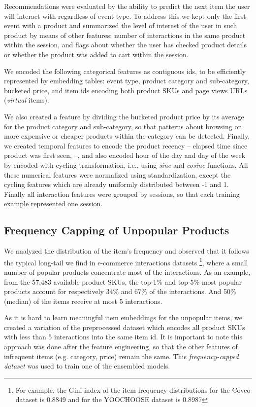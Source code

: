 \documentclass[sigconf,screen]{acmart}
\begin{document}
Recommendations were evaluated by the ability to predict the next item the user will interact with regardless of event type. To address this we kept only the first event with a product and summarized the level of interest of the user in such product by means of other features: number of interactions in the same product within the session, and flags about whether the user has checked product details or whether the product was added to cart within the session.

We encoded the following categorical features as contiguous ids, to be efficiently represented by embedding tables: event type, product category and sub-category, bucketed price, and item ids encoding both product SKUs and page views URLs (\emph{virtual} items). 

We also created a feature by dividing the bucketed product price by its average for the product category and sub-category, so that patterns about browsing on more expensive or cheaper products within the category can be detected. Finally, we created temporal features to encode the product recency -- elapsed time since product was first seen,  --, and also encoded hour of the day and day of the week by encoded with cycling transformation, i.e., using \emph{sine} and \emph{cosine} functions. All these numerical features were normalized using standardization, except the cycling features which are already uniformly distributed between -1 and 1. Finally all interaction features were grouped by sessions, so that each training example represented one session.


\subsection{Frequency Capping of Unpopular Products}
\label{sec:freq_cap}
We analyzed the distribution of the item's frequency and observed that it follows the typical long-tail we find in e-commerce interactions datasets \footnote{For example, the Gini index of the item frequency distributions for the Coveo dataset is 0.8849 and for the YOOCHOOSE dataset\cite{ben2015recsys} is 0.8987}, where a small number of popular products concentrate most of the interactions. As an example, from the 57,483 available product SKUs, the top-1\% and top-5\% most popular products account for respectively 34\% and 67\% of the interactions. And 50\% (median) of the items receive at most 5 interactions. 

As it is hard to learn meaningful item embeddings for the unpopular items, we created a variation of the preprocessed dataset which encodes all product SKUs with less than 5 interactions into the same item id. It is important to note this approach was done after the feature engineering, so that the other features of infrequent items (e.g. category, price) remain the same. This \emph{frequency-capped dataset} was used to train one of the ensembled models.
\end{document}
